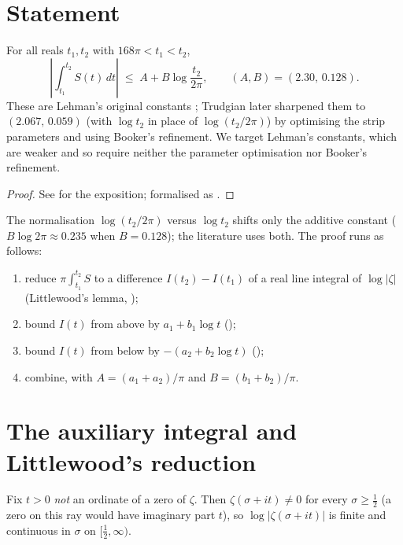 \section{Statement}
\label{sec:lb_statement}

\begin{theorem}
\label{thm:lb_main}
\leanok
{}
For all reals $t_1,t_2$ with $168\pi < t_1 < t_2$,
\[
  \left|\int_{t_1}^{t_2} S(t)\,dt\right| \;\le\; A + B\log\frac{t_2}{2\pi},
  \qquad (A,B) = (2.30,\,0.128) .
\]
These are Lehman's original constants \cite{Lehman1970}; Trudgian
\cite{TrudgianTuring} later sharpened them to $(2.067,\,0.059)$ (with $\log t_2$
in place of $\log(t_2/2\pi)$) by optimising the strip parameters and using
Booker's refinement. We target Lehman's constants, which are weaker and so
require neither the parameter optimisation nor Booker's refinement.
\end{theorem}

\begin{proof}
\leanok
{}
See  for the exposition; formalised as
.
\end{proof}

The normalisation $\log(t_2/2\pi)$ versus $\log t_2$ shifts only the additive
constant ($B\log 2\pi\approx0.235$ when $B=0.128$); the literature uses both. The
proof runs as follows:
\begin{enumerate}
  \item reduce $\pi\int_{t_1}^{t_2}S$ to a difference $I(t_2)-I(t_1)$ of a real
        line integral of $\log|\zeta|$ (Littlewood's lemma, );
  \item bound $I(t)$ from above by $a_1 + b_1\log t$ ();
  \item bound $I(t)$ from below by $-(a_2 + b_2\log t)$ ();
  \item combine, with $A = (a_1+a_2)/\pi$ and $B=(b_1+b_2)/\pi$.
\end{enumerate}

\section{The auxiliary integral and Littlewood's reduction}
\label{sec:lb_littlewood}

Fix $t>0$ \emph{not} an ordinate of a zero of $\zeta$. Then $\zeta(\sigma+it)\neq0$
for every $\sigma\ge\tfrac12$ (a zero on this ray would have imaginary part $t$),
so $\log|\zeta(\sigma+it)|$ is finite and continuous in $\sigma$ on $[\tfrac12,\infty)$.

